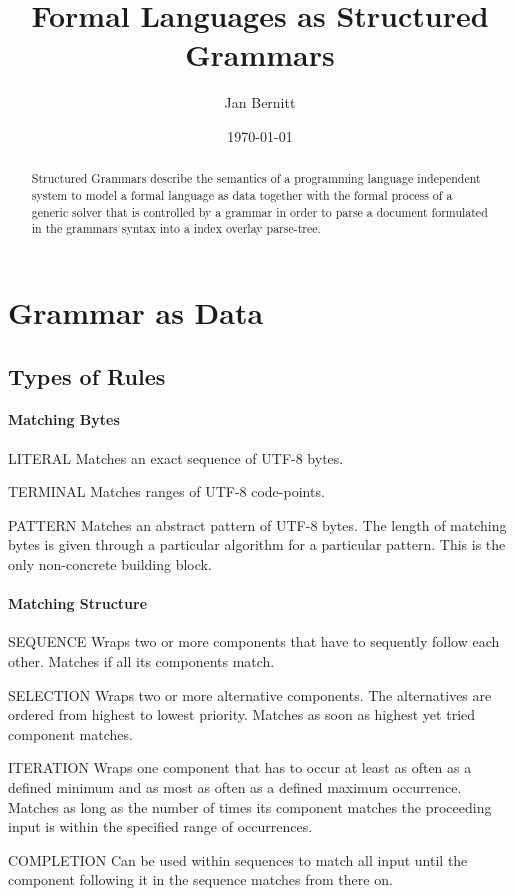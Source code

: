 \documentclass[10pt,a4paper]{article}
\begin{document}
\title{Formal Languages as Structured Grammars}
\author{Jan Bernitt}
\date{\today}
\maketitle

\begin{abstract}
\noindent Structured Grammars describe the semantics of a programming language independent system to model a formal language as data together with the formal process of a generic solver that is controlled by a grammar in order to parse a document formulated in the grammars syntax into a index overlay parse-tree.
\end{abstract}
\section{Grammar as Data}
\subsection{Types of Rules}
\paragraph{Matching Bytes}
\begin{rulelist}
\item[LITERAL] Matches an exact sequence of UTF-8 bytes.
\item[TERMINAL] Matches ranges of UTF-8 code-points.
\item[PATTERN] Matches an abstract pattern of UTF-8 bytes. The length of matching bytes is given through a particular algorithm for a particular pattern. This is the only non-concrete building block.
\end{rulelist}

\paragraph{Matching Structure}
\begin{rulelist}
\item[SEQUENCE] Wraps two or more components that have to sequently follow each other. Matches if all its components match.
\item[SELECTION] Wraps two or more alternative components. The alternatives are ordered from highest to lowest priority. Matches as soon as highest yet tried component matches.
\item[ITERATION] Wraps one component that has to occur at least as often as a defined minimum and as most as often as a defined maximum occurrence. Matches as long as the number of times its component matches the proceeding input is within the specified range of occurrences.
\item[COMPLETION] Can be used within sequences to match all input until the component following it in the sequence matches from there on. 
\end{rulelist}
\end{document}
